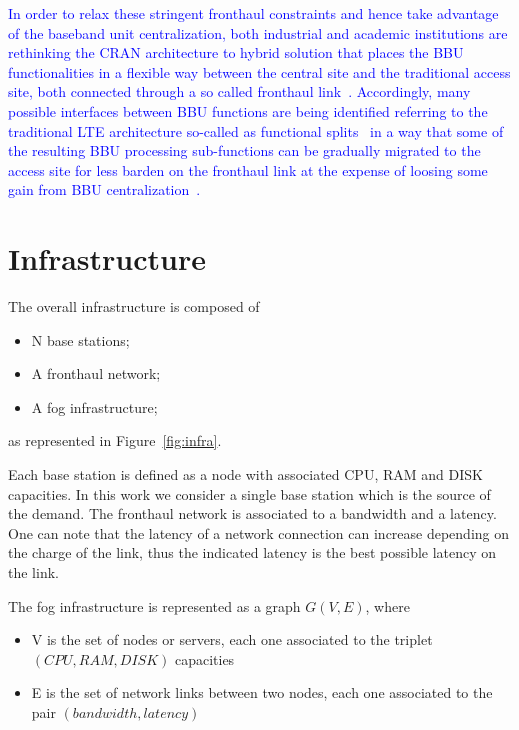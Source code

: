 \documentclass[
    a4paper, 
    12pt, onecolumn,
]{article}
\begin{document}
\textcolor{blue}{
In order to relax these stringent fronthaul constraints and  hence take advantage of  the baseband unit centralization,  both industrial and academic institutions are rethinking the CRAN architecture to hybrid solution that places the BBU functionalities in a flexible way between the central site and the traditional access site, both connected through a so called fronthaul link~\cite{CITE-012, CITE-013, CITE-014, CITE-015,  CITE-028}. Accordingly, many possible interfaces between BBU functions are being identified referring to the traditional LTE architecture so-called as functional splits~\cite{CITE-017} in a way that some of the resulting BBU processing sub-functions can be gradually migrated to the access site for less barden on the fronthaul link at the expense of loosing some gain from BBU centralization~\cite{CITE-018}.
}

\section{Infrastructure}
The overall infrastructure is composed of
\begin{itemize}
\item N base stations;
\item A fronthaul network;
\item A fog infrastructure;
\end{itemize}
as represented in Figure~\ref{fig:infra}.

Each base station is defined as a node with associated CPU, RAM and DISK capacities. In this work we consider a single base station which is the source of the demand. The fronthaul network is associated to a bandwidth and a latency. One can note that the latency of a network connection can increase depending on the charge of the link, thus the indicated latency is the best possible latency on the link.

The fog infrastructure is represented as a graph $G(V,E)$, where
\begin{itemize}
\item V is the set of nodes or servers, each one associated to the triplet $(CPU,RAM,DISK)$ capacities
\item E is the set of network links between two nodes, each one associated to the pair $(bandwidth,latency)$
\end{itemize}
\end{document}
